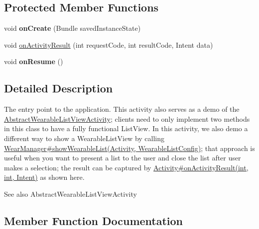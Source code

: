 \subsection*{Protected Member Functions}
\begin{DoxyCompactItemize}
\item 
void {\bfseries on\+Create} (Bundle saved\+Instance\+State)\hypertarget{classcom_1_1example_1_1android_1_1wearable_1_1wcldemo_1_1MyListActivity_a530a0f5d09f7d5636a5e90f7fccbf055}{}\label{classcom_1_1example_1_1android_1_1wearable_1_1wcldemo_1_1MyListActivity_a530a0f5d09f7d5636a5e90f7fccbf055}

\item 
void \hyperlink{classcom_1_1example_1_1android_1_1wearable_1_1wcldemo_1_1MyListActivity_ac9367639e40812209a7d0e4df226a845}{on\+Activity\+Result} (int request\+Code, int result\+Code, Intent data)
\item 
void {\bfseries on\+Resume} ()\hypertarget{classcom_1_1example_1_1android_1_1wearable_1_1wcldemo_1_1MyListActivity_adc017146a7a2ad1766456f5d5931b9b5}{}\label{classcom_1_1example_1_1android_1_1wearable_1_1wcldemo_1_1MyListActivity_adc017146a7a2ad1766456f5d5931b9b5}

\end{DoxyCompactItemize}


\subsection{Detailed Description}
The entry point to the application. This activity also serves as a demo of the \hyperlink{}{Abstract\+Wearable\+List\+View\+Activity}; clients need to only implement two methods in this class to have a fully functional List\+View. In this activity, we also demo a different way to show a Wearable\+List\+View by calling \hyperlink{classcom_1_1google_1_1devrel_1_1wcl_1_1WearManager_a446c9ae3e23609bc16d87e4ece91ed72}{Wear\+Manager\#show\+Wearable\+List(\+Activity, Wearable\+List\+Config)}; that approach is useful when you want to present a list to the user and close the list after user makes a selection; the result can be captured by \hyperlink{}{Activity\#on\+Activity\+Result(int, int, Intent)} as shown here.

\begin{DoxySeeAlso}{See also}
Abstract\+Wearable\+List\+View\+Activity 
\end{DoxySeeAlso}


\subsection{Member Function Documentation}
